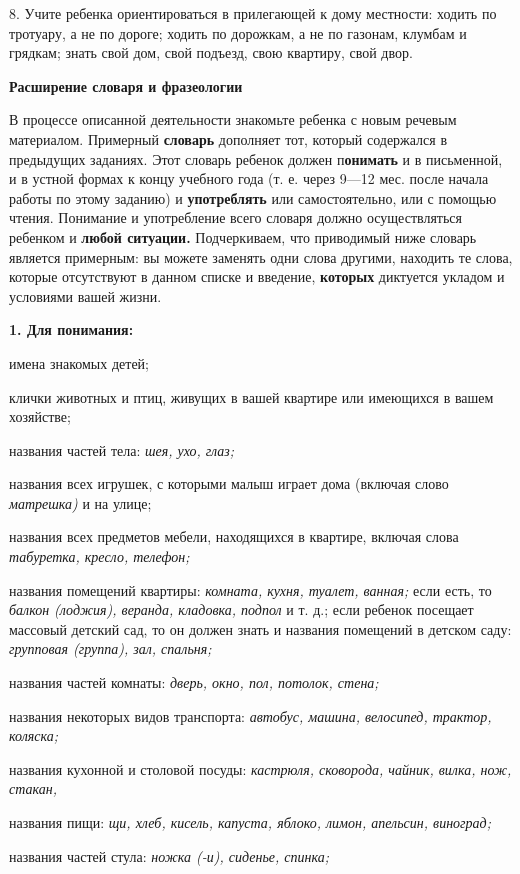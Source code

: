 \documentclass{book}
\renewcommand{\emph}[1]{\textit{#1}}
\begin{document}
8. Учите ребенка ориентироваться в прилегающей к дому местности: ходить
по тротуару, а не по дороге; ходить по дорожкам, а не по газонам,
клумбам и грядкам; знать свой дом, свой подъезд, свою квартиру, свой
двор.

\textbf{Расширение словаря и фразеологии}

В процессе описанной деятельности знакомьте ребенка с новым речевым
материалом. Примерный \textbf{словарь} дополняет тот, который содержался
в предыдущих заданиях. Этот словарь ребенок должен п\textbf{онимать} и в
письменной, и в устной формах к концу учебного года (т. е. через 9---12
мес. после начала работы по этому заданию) и \textbf{употреблять} или
самостоятельно, или с помощью чтения. Понимание и употребление всего
словаря должно осуществляться ребенком и \textbf{любой ситуации.}
Подчеркиваем, что приводимый ниже словарь является примерным: вы можете
заменять одни слова другими, находить те слова, которые отсутствуют в
данном списке и введение, \textbf{которых} диктуется укладом и условиями
вашей жизни.

\textbf{1. Для понимания:}

имена знакомых детей;

клички животных и птиц, живущих в вашей квартире или имеющихся в вашем
хозяйстве;

названия частей тела: \emph{шея, ухо, глаз;}

названия всех игрушек, с которыми малыш играет дома (включая слово
\emph{матрешка)} и на улице;

названия всех предметов мебели, находящихся в квартире, включая слова
\emph{табуретка, кресло, телефон;}

названия помещений квартиры: \emph{комната, кухня, туалет, ванная;} если
есть, то \emph{балкон (лоджия), веранда, кладовка, подпол} и т. д.; если
ребенок посещает массовый детский сад, то он должен знать и названия
помещений в детском саду: \emph{групповая (группа), зал, спальня;}

названия частей комнаты: \emph{дверь, окно, пол, потолок, стена;}

названия некоторых видов транспорта: \emph{автобус, машина, велосипед,
трактор, коляска;}

названия кухонной и столовой посуды: \emph{кастрюля, сковорода, чайник,
вилка, нож, стакан,}

названия пищи: \emph{щи, хлеб, кисель, капуста, яблоко, лимон, апельсин,
виноград;}

названия частей стула: \emph{ножка (-и), сиденье, спинка;}
\end{document}
